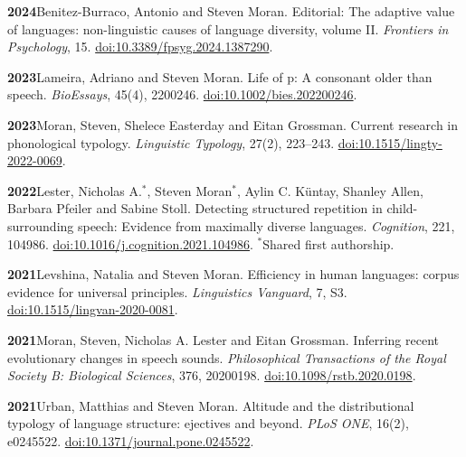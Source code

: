 \documentclass[11pt]{article}
\newcommand{\hangpara}{
 \setlength{\parindent}{0in} %
 \hangindent=0.42in %
}
\begin{document}
\vskip 6pt
\hangpara
{\bf 2024}\hspace{1ex}Benitez-Burraco, Antonio and Steven Moran. Editorial: The adaptive value of languages: non-linguistic causes of language diversity, volume II. \textit{Frontiers in Psychology}, 15. \href{https://doi.org/10.3389/fpsyg.2024.1387290}{doi:10.3389/\allowbreak fpsyg.2024.1387290}.

\vskip 6pt
\hangpara
{\bf 2023}\hspace{1ex}Lameira, Adriano and Steven Moran. Life of p: A consonant older than speech. \textit{BioEssays}, 45(4), 2200246. \href{https://doi.org/10.1002/bies.202200246}{doi:10.1002/bies.202200246}.

\hangpara
\vskip 6pt
{\bf 2023}\hspace{1ex}Moran, Steven, Shelece Easterday and Eitan Grossman. Current research in phonological typology. \textit{Linguistic Typology}, 27(2), 223--243. \href{https://doi.org/10.1515/lingty-2022-0069}{doi:10.1515/lingty-2022-0069}.

\hangpara
\vskip 6pt
{\bf 2022}\hspace{1ex}Lester, Nicholas A.$^*$, Steven Moran$^*$, Aylin C. K{\"u}ntay, Shanley Allen, Barbara Pfeiler and Sabine Stoll. Detecting structured repetition in child-surrounding speech: Evidence from maximally diverse languages. \textit{Cognition}, 221, 104986. \href{https://doi.org/10.1016/j.cognition.2021.104986}{doi:10.1016/j.cognition.2021.104986}. $^*$Shared first authorship.

\hangpara
\vskip 6pt
{\bf 2021}\hspace{1ex}Levshina, Natalia and Steven Moran. Efficiency in human languages: corpus evidence for universal principles. \textit{Linguistics Vanguard}, 7, S3. \href{https://doi.org/10.1515/lingvan-2020-0081}{doi:10.1515/lingvan-2020-0081}.

\hangpara
\vskip 6pt
{\bf 2021}\hspace{1ex}Moran, Steven, Nicholas A. Lester and Eitan Grossman. Inferring recent evolutionary changes in speech sounds. \textit{Philosophical Transactions of the Royal Society B: Biological Sciences}, 376, 20200198. \href{https://doi.org/10.1098/rstb.2020.0198}{doi:10.1098/rstb.2020.0198}.

\hangpara
\vskip 6pt
{\bf 2021}\hspace{1ex}Urban, Matthias and Steven Moran. Altitude and the distributional typology of language structure: ejectives and beyond. \textit{PLoS ONE}, 16(2), e0245522. \href{https://doi.org/10.1371/journal.pone.0245522}{doi:10.1371/journal.pone.0245522}.
\end{document}
